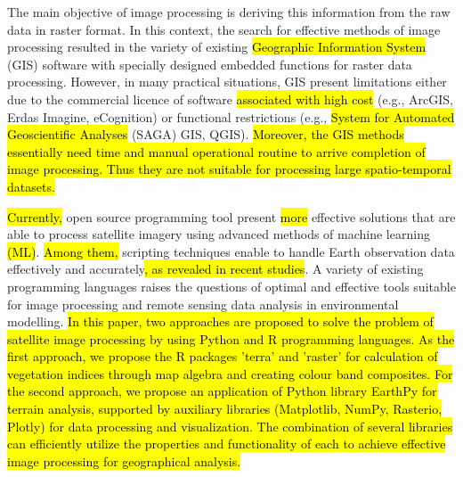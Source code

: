\documentclass[jimaging,article,submit,pdftex,moreauthors]{Definitions/mdpi}
\begin{document}
The main objective of image processing is deriving this information from the raw data in raster format. In this context, the search for effective methods of image processing resulted in the variety of existing \hl{Geographic Information System} (GIS) software with specially designed embedded functions for raster data processing. However, in many practical situations, GIS present limitations either due to the commercial licence of software \hl{associated with high cost} (e.g., ArcGIS, Erdas Imagine, eCognition) or functional restrictions (e.g., \hl{System for Automated Geoscientific Analyses} (SAGA) GIS, QGIS). \hl{Moreover, the GIS methods essentially need time and manual operational routine to arrive completion of image processing. Thus they are not suitable for processing large spatio-temporal datasets.} 

\hl{Currently, }open source programming tool present \hl{more} effective solutions that are able to process satellite imagery using advanced methods of machine learning \hl{(ML)}\cite{MASOLELE2021112600,9066075,MARTINS2022113203,rs71114876}. \hl{Among them,} scripting techniques enable to handle Earth observation data effectively and accurately\hl{, as revealed in recent studies}\cite{6344536,ELLEFSEN20191171,Lemenkova202212,6910592,Lemenkova202215,4160259}. A variety of existing programming languages raises the questions of optimal and effective tools suitable for image processing and remote sensing data analysis in environmental modelling. \hl{In this paper, two approaches are proposed to solve the problem of satellite image processing by using Python and R programming languages. As the first approach, we propose the R packages 'terra' and 'raster' for calculation of vegetation indices through map algebra and creating colour band composites. For the second approach, we propose an application of Python library  EarthPy for terrain analysis, supported by auxiliary libraries (Matplotlib, NumPy, Rasterio, Plotly) for data processing and visualization. The combination of several libraries can efficiently utilize the properties and functionality of each to achieve effective image processing for geographical analysis.}
\end{document}
